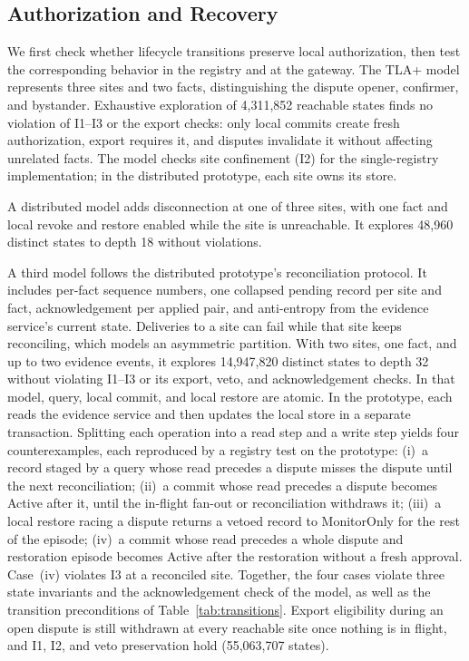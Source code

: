 \documentclass[journal]{IEEEtran}
\theoremstyle{definition}
\begin{document}
\subsection{Authorization and Recovery}
\label{sec:lifecycle-results}
We first check whether lifecycle transitions preserve local authorization, then test the corresponding behavior in the registry and at the gateway. The TLA+ model represents three sites and two facts, distinguishing the dispute opener, confirmer, and bystander. Exhaustive exploration of 4,311,852 reachable states finds no violation of I1--I3 or the export checks: only local commits create fresh authorization, export requires it, and disputes invalidate it without affecting unrelated facts. The model checks site confinement (I2) for the single-registry implementation; in the distributed prototype, each site owns its store.

A distributed model adds disconnection at one of three sites, with one fact and local revoke and restore enabled while the site is unreachable. It explores 48,960 distinct states to depth 18 without violations.

A third model follows the distributed prototype's reconciliation protocol. It includes per-fact sequence numbers, one collapsed pending record per site and fact, acknowledgement per applied pair, and anti-entropy from the evidence service's current state. Deliveries to a site can fail while that site keeps reconciling, which models an asymmetric partition. With two sites, one fact, and up to two evidence events, it explores 14,947,820 distinct states to depth 32 without violating I1--I3 or its export, veto, and acknowledgement checks. In that model, query, local commit, and local restore are atomic. In the prototype, each reads the evidence service and then updates the local store in a separate transaction. Splitting each operation into a read step and a write step yields four counterexamples, each reproduced by a registry test on the prototype:
(i)~a record staged by a query whose read precedes a dispute misses the dispute until the next reconciliation;
(ii)~a commit whose read precedes a dispute becomes Active after it, until the in-flight fan-out or reconciliation withdraws it;
(iii)~a local restore racing a dispute returns a vetoed record to MonitorOnly for the rest of the episode;
(iv)~a commit whose read precedes a whole dispute and restoration episode becomes Active after the restoration without a fresh approval.
Case~(iv) violates I3 at a reconciled site. Together, the four cases violate three state invariants and the acknowledgement check of the model, as well as the transition preconditions of Table~\ref{tab:transitions}. Export eligibility during an open dispute is still withdrawn at every reachable site once nothing is in flight, and I1, I2, and veto preservation hold (55,063,707 states).
\end{document}
